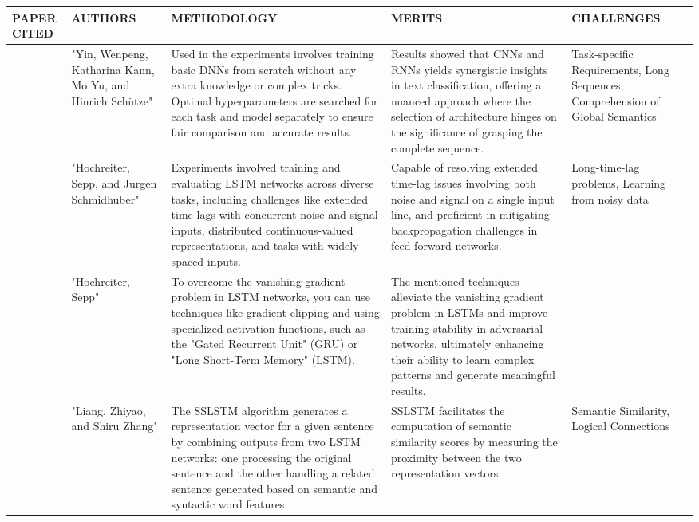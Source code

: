 \documentclass[conference]{IEEEtran}
\begin{document}
\begin{table}
\begin{center}
 \centering
    \begin{tabular}{ |p{1cm}|p{2cm}|p{4cm}|p{4cm}|p{4cm}| }
\hline
\centering PAPER CITED & \centering  AUTHORS & \centering METHODOLOGY &  \centering MERITS &  \centering CHALLENGES \arraybackslash \\ 
\hline
[14]  &  "Yin, Wenpeng, Katharina Kann, Mo Yu, and Hinrich Schütze" &  Used in the experiments involves training basic DNNs from scratch without any extra knowledge or complex tricks. Optimal hyperparameters are searched for each task and model separately to ensure fair comparison and accurate results. &  Results showed that CNNs and RNNs yields synergistic insights in text classification, offering a nuanced approach where the selection of architecture hinges on the significance of grasping the complete sequence. &  Task-specific Requirements, Long Sequences, Comprehension of Global Semantics  \\
\hline
[15] &  "Hochreiter, Sepp, and Jurgen Schmidhuber" & Experiments involved training and evaluating LSTM networks across diverse tasks, including challenges like extended time lags with concurrent noise and signal inputs, distributed continuous-valued representations, and tasks with widely spaced inputs. & Capable of resolving extended time-lag issues involving both noise and signal on a single input line, and proficient in mitigating backpropagation challenges in feed-forward networks. &  Long-time-lag problems, Learning from noisy data  \\
\hline
[16] &  "Hochreiter, Sepp" &  To overcome the vanishing gradient problem in LSTM networks, you can use techniques like gradient clipping and using specialized activation functions, such as the "Gated Recurrent Unit" (GRU) or "Long Short-Term Memory" (LSTM). &  The mentioned techniques alleviate the vanishing gradient problem in LSTMs and improve training stability in adversarial networks, ultimately enhancing their ability to learn complex patterns and generate meaningful results. & -  \\
\hline
[17]  &  "Liang, Zhiyao, and Shiru Zhang" &  The SSLSTM algorithm generates a representation vector for a given sentence by combining outputs from two LSTM networks: one processing the original sentence and the other handling a related sentence generated based on semantic and syntactic word features. &  SSLSTM facilitates the computation of semantic similarity scores by measuring the proximity between the two representation vectors. &  Semantic Similarity, Logical Connections  \\

\end{tabular}
\end{center}
\end{table}
\end{document}
